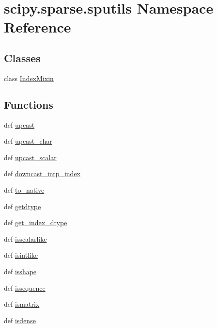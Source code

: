 \hypertarget{namespacescipy_1_1sparse_1_1sputils}{}\section{scipy.\+sparse.\+sputils Namespace Reference}
\label{namespacescipy_1_1sparse_1_1sputils}
\subsection*{Classes}
\begin{DoxyCompactItemize}
\item 
class \hyperlink{classscipy_1_1sparse_1_1sputils_1_1IndexMixin}{Index\+Mixin}
\end{DoxyCompactItemize}
\subsection*{Functions}
\begin{DoxyCompactItemize}
\item 
def \hyperlink{namespacescipy_1_1sparse_1_1sputils_a6f3d146d9f8b3e30e8bb0de9c681de12}{upcast}
\item 
def \hyperlink{namespacescipy_1_1sparse_1_1sputils_a172398573f946dd1c8339f016ebd892e}{upcast\+\_\+char}
\item 
def \hyperlink{namespacescipy_1_1sparse_1_1sputils_a038b2effce7e72c22558420bcdfcc558}{upcast\+\_\+scalar}
\item 
def \hyperlink{namespacescipy_1_1sparse_1_1sputils_a4f34586633741867705dd8ff22c12b87}{downcast\+\_\+intp\+\_\+index}
\item 
def \hyperlink{namespacescipy_1_1sparse_1_1sputils_a97894ef37a7ab2d8610344311fdabbf9}{to\+\_\+native}
\item 
def \hyperlink{namespacescipy_1_1sparse_1_1sputils_af9a10e9aa10d92ac425f925515138573}{getdtype}
\item 
def \hyperlink{namespacescipy_1_1sparse_1_1sputils_add693b57e97d82b8b99f3768d3ca6f14}{get\+\_\+index\+\_\+dtype}
\item 
def \hyperlink{namespacescipy_1_1sparse_1_1sputils_a6b22f49f8e7a7bf5da4a812299982019}{isscalarlike}
\item 
def \hyperlink{namespacescipy_1_1sparse_1_1sputils_ac628823524df63b157a69e45749440b6}{isintlike}
\item 
def \hyperlink{namespacescipy_1_1sparse_1_1sputils_ab32dc16eba987427330cc5af006596a4}{isshape}
\item 
def \hyperlink{namespacescipy_1_1sparse_1_1sputils_a0671251b90287419626e8e3333663d72}{issequence}
\item 
def \hyperlink{namespacescipy_1_1sparse_1_1sputils_a3f55e4398e1483c8498ef2dc89bf7316}{ismatrix}
\item 
def \hyperlink{namespacescipy_1_1sparse_1_1sputils_a2146f226e784d77069a37edabaf99400}{isdense}
\end{DoxyCompactItemize}
